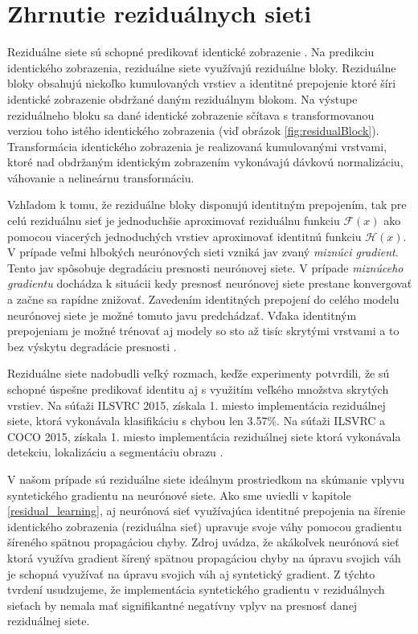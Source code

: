 \section{Zhrnutie reziduálnych sieti}
\label{conclusionResNet}

Reziduálne siete sú schopné predikovať identické zobrazenie \cite{Wu2017, He2016, Targ2016}. Na predikciu identického zobrazenia, reziduálne siete využívajú reziduálne bloky. Reziduálne bloky obsahujú niekoľko kumulovaných vrstiev a identitné prepojenie ktoré šíri identické zobrazenie obdržané daným reziduálnym blokom. Na výstupe reziduálneho bloku sa dané identické zobrazenie sčítava s transformovanou verziou toho istého identického zobrazenia (viď obrázok \ref{fig:residualBlock}). Transformácia identického zobrazenia je realizovaná kumulovanými vrstvami, ktoré nad obdržaným identickým zobrazením vykonávajú dávkovú normalizáciu, váhovanie a nelineárnu transformáciu.

Vzhľadom k tomu, že reziduálne bloky disponujú identitným prepojením, tak pre celú reziduálnu sieť je jednoduchšie aproximovať reziduálnu funkciu $\mathcal{F}(x)$ ako pomocou viacerých jednoduchých vrstiev aproximovať identitnú funkciu $\mathcal{H}(x)$. V prípade veľmi hlbokých neurónových sieti vzniká jav zvaný \textit{miznúci gradient}. Tento jav spôsobuje degradáciu presnosti neurónovej siete. V prípade \textit{miznúceho gradientu} dochádza k situácii kedy presnosť neurónovej siete prestane konvergovať a začne sa rapídne znižovať. Zavedením identitných prepojení do celého modelu neurónovej siete je možné tomuto javu predchádzať. Vďaka identitným prepojeniam je možné trénovať aj modely so sto až tisíc skrytými vrstvami a to bez výskytu degradácie presnosti \cite{Wu2017}.

Reziduálne siete nadobudli veľký rozmach, keďže experimenty potvrdili, že sú schopné úspešne predikovať identitu aj s využitím veľkého množstva skrytých vrstiev. Na súťaži ILSVRC 2015, získala 1. miesto implementácia reziduálnej siete, ktorá vykonávala klasifikáciu s chybou len 3.57\%. Na súťaži ILSVRC a COCO 2015, získala 1. miesto implementácia reziduálnej siete ktorá vykonávala detekciu, lokalizáciu a segmentáciu obrazu \cite{Wu2017}.

V našom prípade sú reziduálne siete ideálnym prostriedkom na skúmanie vplyvu syntetického gradientu na neurónové siete. Ako sme uviedli v kapitole \ref{residual_learning}, aj neurónová sieť využívajúca identitné prepojenia na šírenie identického zobrazenia (reziduálna sieť) upravuje svoje váhy pomocou gradientu šíreného spätnou propagáciou chyby. Zdroj \cite{Jaderberg2016} uvádza, že akákoľvek neurónová sieť ktorá využíva gradient šírený spätnou propagáciou chyby na úpravu svojich váh je schopná využívať na úpravu svojich váh aj syntetický gradient. Z týchto tvrdení usudzujeme, že implementácia syntetického gradientu v reziduálnych sieťach by nemala mať signifikantné negatívny vplyv na presnosť danej reziduálnej siete.